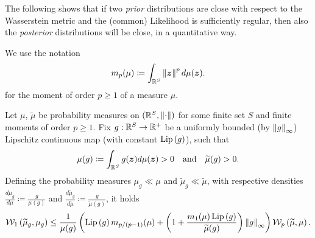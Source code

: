 The following  shows that if two \textit{prior} distributions are close with respect to the Wasserstein metric and the (common) Likelihood is sufficiently regular, then also the \textit{posterior} distributions will be close, in a quantitative way.

\smallskip

We use the notation
\begin{equation*}
	m_{p}(\mu) \coloneqq \int_{\real^S} \norm{\bm{z}}^{p} d \mu(\bm{z}).
\end{equation*}
for the moment of order $p \geq 1$ of a measure $\mu$.

\begin{lemma} \label{lem:nnposterior}
	Let $\mu$, $\widetilde{\mu}$ be probability measures on $(\real^S, \norm{\cdot})$ for some finite set $S$ and finite moments of order $p \geq 1$.
	Fix $g: \real^S \to \real^+$ be a uniformly bounded (by $\norm{g}_\infty$) Lipschitz continuous map (with constant $\lipschitz{g}$), such that
	\begin{equation*}
		\mu(g) \coloneqq \int_{\real^S} g(\bm{z}) d\mu(\bm{z}) > 0 \quad \text{and} \quad \widetilde{\mu}(g) >0.
	\end{equation*}
	Defining the probability measures $\mu_g \ll \mu$ and $\widetilde{\mu}_g \ll \widetilde{\mu}$, with respective densities $\frac{d\mu_g}{d\mu} \coloneqq \frac{g}{\mu(g)}$ and $\frac{d\widetilde{\mu}_g}{d\widetilde{\mu}} \coloneqq \frac{g}{\widetilde{\mu}(g)}$, it holds
	\begin{equation} \label{eq:wassposterior}
		\wass[1]{\widetilde{\mu}_g}{\mu_g} \leq \frac{1}{\mu(g)} \left(\lipschitz{g} m_{p / (p - 1)}(\mu) + \left(1 + \frac{m_1(\mu) \lipschitz{g}}{\widetilde{\mu}(g)}\right) \norm{g}_{\infty}\right) \wass[p]{\widetilde{\mu}}{\mu}.
	\end{equation}
\end{lemma}

